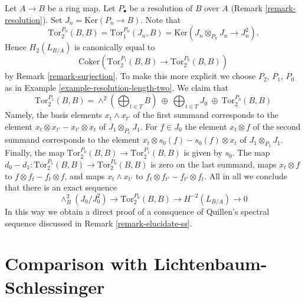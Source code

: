 \begin{remark}
\label{remark-elucidate-degree-two}
Let $A \to B$ be a ring map. Let $P_\bullet$ be a resolution of
$B$ over $A$ (Remark \ref{remark-resolution}).
Set $J_n = \text{Ker}(P_n \to B)$. Note that
$$
\text{Tor}_2^{P_n}(B, B) = 
\text{Tor}_1^{P_n}(J_n, B) =
\text{Ker}(J_n \otimes_{P_n} J_n \to J_n^2).
$$
Hence $H_2(L_{B/A})$ is canonically equal to
$$
\text{Coker}(\text{Tor}_2^{P_1}(B, B) \to \text{Tor}_2^{P_0}(B, B))
$$
by Remark \ref{remark-surjection}. To make this more explicit we choose
$P_2$, $P_1$, $P_0$ as in Example \ref{example-resolution-length-two}.
We claim that
$$
\text{Tor}_2^{P_1}(B, B) =
\wedge^2(\bigoplus\nolimits_{t \in T} B)\ \oplus
\ \bigoplus\nolimits_{t \in T} J_0\ \oplus
\ \text{Tor}_2^{P_0}(B, B)
$$
Namely, the basis elements $x_t \wedge x_{t'}$ of the first summand
corresponds to the element $x_t \otimes x_{t'} - x_{t'} \otimes x_t$
of $J_1 \otimes_{P_1} J_1$. For $f \in J_0$ the element $x_t \otimes f$
of the second summand corresponds to the element
$x_t \otimes s_0(f) - s_0(f) \otimes x_t$ of $J_1 \otimes_{P_1} J_1$.
Finally, the map $\text{Tor}_2^{P_0}(B, B) \to \text{Tor}_2^{P_1}(B, B)$
is given by $s_0$. The map
$d_0 - d_1 : \text{Tor}_2^{P_1}(B, B) \to \text{Tor}_2^{P_0}(B, B)$
is zero on the last summand, maps $x_t \otimes f$ to
$f \otimes f_t - f_t \otimes f$, and maps $x_t \wedge x_{t'}$
to $f_t \otimes f_{t'} - f_{t'} \otimes f_t$. All in all we conclude
that there is an exact sequence
$$
\wedge^2_B(J_0/J_0^2) \to \text{Tor}_2^{P_0}(B, B) \to H^{-2}(L_{B/A}) \to 0
$$
In this way we obtain a direct proof of a consquence of Quillen's spectral
sequence discussed in Remark \ref{remark-elucidate-ss}.
\end{remark}






\section{Comparison with Lichtenbaum-Schlessinger}
\label{section-compare-higher}


